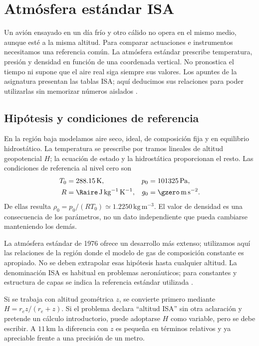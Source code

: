 \chapter{Atmósfera estándar ISA}\label{ch:04}

Un avión ensayado en un día frío y otro cálido no opera en el mismo medio, aunque esté a la misma altitud. Para comparar actuaciones e instrumentos necesitamos una referencia común. La atmósfera estándar prescribe temperatura, presión y densidad en función de una coordenada vertical. No pronostica el tiempo ni supone que el aire real siga siempre sus valores. Los apuntes de la asignatura presentan las tablas ISA; aquí deducimos sus relaciones para poder utilizarlas sin memorizar números aislados \cite{TAE2,ISA1976}.

\section{Hipótesis y condiciones de referencia}
En la región baja modelamos aire seco, ideal, de composición fija y en equilibrio hidrostático. La temperatura se prescribe por tramos lineales de altitud geopotencial $H$; la ecuación de estado y la hidrostática proporcionan el resto. Las condiciones de referencia al nivel cero son
\begin{align}
 T_0&=288.15\,\mathrm{K},& p_0&=101325\,\mathrm{Pa},\\
 R&=\Raire\,\mathrm{J\,kg^{-1}\,K^{-1}},& g_0&=\gzero\,\mathrm{m\,s^{-2}}.
\end{align}
De ellas resulta $\rho_0=p_0/(RT_0)\simeq1.2250\,\mathrm{kg\,m^{-3}}$. El valor de densidad es una consecuencia de los parámetros, no un dato independiente que pueda cambiarse manteniendo los demás.

La atmósfera estándar de 1976 ofrece un desarrollo más extenso; utilizamos aquí las relaciones de la región donde el modelo de gas de composición constante es apropiado. No se deben extrapolar esas hipótesis hasta cualquier altitud. La denominación ISA es habitual en problemas aeronáuticos; para constantes y estructura de capas se indica la referencia estándar utilizada \cite{ISA1976}.

Si se trabaja con altitud geométrica $z$, se convierte primero mediante $H=r_ez/(r_e+z)$. Si el problema declara ``altitud ISA'' sin otra aclaración y pretende un cálculo introductorio, puede adoptarse $H$ como variable, pero se debe escribir. A $11\,\mathrm{km}$ la diferencia con $z$ es pequeña en términos relativos y ya apreciable frente a una precisión de un metro.

